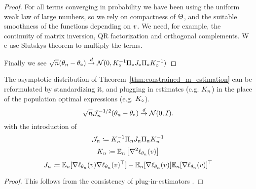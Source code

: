 \begin{proof}
    For all terms converging in probability we have been using the uniform weak law of large numbers, so we rely on compactness of $\Theta$, and the suitable smoothness of the functions depending on $v$.
    We need, for example, the continuity of matrix inversion, QR factorization and orthogonal complements. W
    e use Slutskys theorem to multiply the terms.

    Finally we see $\sqrt{n} ( \theta_n - \theta_\circ) \overset{d}{\to} \mathcal N(0,K_\circ^{-1}\Pi_\circ J_\circ\Pi_\circ K_\circ^{-1})$
\end{proof}

\begin{corollary} \label{cor:constrained_m_est}
    The asymptotic distribution of Theorem~\ref{thm:constrained_m_estimation} can be reformulated by standardizing it, and plugging in estimates (e.g. $K_n$) in the place of the population optimal expressions (e.g. $K_\circ$).
    \[\sqrt{n}\mathcal J_n^{-1/2} ( \theta_n - \theta_\circ) \overset{d}{\to} \mathcal N(0,I).\]
    with the introduction of
    \[ \mathcal J_n \coloneqq K_n^{-1}\Pi_nJ_n\Pi_nK_n^{-1}  \]
    \[K_n\coloneqq \mathbb{E}_n \left[ \nabla^2 \ell_{\theta_n} (v)\right]\]
    \[ J_n \coloneqq \mathbb{E}_n[\nabla \ell_{\theta_n}(v)\nabla \ell_{\theta_n}(v)^\top]
        -\mathbb{E}_n[\nabla \ell_{\theta_n}(v)]\mathbb{E}_n[\nabla \ell_{\theta_n}(v)]^\top\]
\end{corollary}
\begin{proof}
    This follows from the consistency of plug-in-estimators \citep[Theorem 12.2]{wooldridge_econometric_2010}.
\end{proof}
